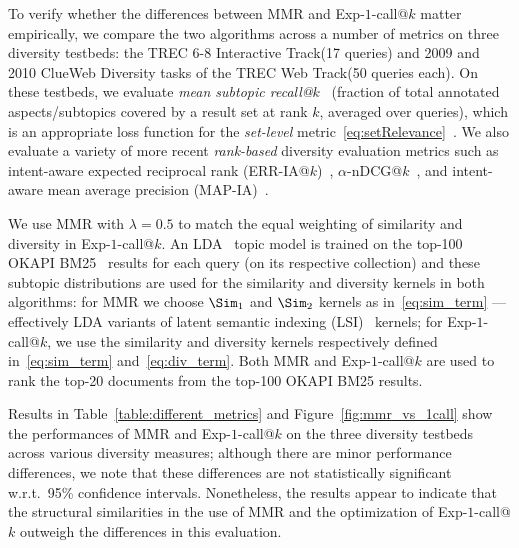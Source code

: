 
To verify whether the differences between MMR and Exp-$1$-call@$k$
matter empirically, we compare the two algorithms across a number of
metrics on three diversity testbeds: the TREC 6-8 Interactive
Track\footnotemark[1] (17 queries) and 2009 and 2010 ClueWeb Diversity
tasks of the TREC Web Track\footnotemark[2] (50 queries each).  On
these testbeds, we evaluate \emph{mean subtopic
recall@$k$}~\cite{zhai03Beyond} (fraction of total annotated
aspects/subtopics covered by a result set at rank $k$, averaged over
queries), which is an appropriate loss function for the
\emph{set-level} metric~\eqref{eq:setRelevance}~\cite{chen06Less}.  We
also evaluate a variety of more recent \emph{rank-based} diversity evaluation
metrics such as intent-aware expected reciprocal rank
(ERR-IA@$k$)~\cite{err-ia}, $\alpha$-nDCG@$k$~\cite{clarke08Novelty},
and intent-aware mean average precision
(MAP-IA)~\cite{agrawal09diversifying}.

We use MMR with $\lambda = 0.5$ to match the equal weighting of
similarity and diversity in Exp-$1$-call@$k$.  An
LDA~\cite{blei03Latent} topic model is trained on the top-100 OKAPI
BM25~\cite{bm25} results for each query (on its respective collection)
and these subtopic distributions are used for the similarity and
diversity kernels in both algorithms: for MMR we choose $\Sim_1$ and
$\Sim_2$ kernels as in~\eqref{eq:sim_term} --- effectively LDA
variants of latent semantic indexing (LSI)~\cite{deerwester90LSA}
kernels; for Exp-$1$-call@$k$, we use the similarity and diversity
kernels respectively defined in~\eqref{eq:sim_term}
and~\eqref{eq:div_term}.  Both MMR and Exp-$1$-call@$k$ are used to
rank the top-20 documents from the top-100 OKAPI BM25 results.

Results in Table~\ref{table:different_metrics} and
Figure~\ref{fig:mmr_vs_1call} show the performances of MMR and
Exp-$1$-call@$k$ on the three diversity testbeds across various
diversity measures; although there are minor performance differences,
we note that these differences are not statistically significant
w.r.t.\ 95\% confidence intervals.  Nonetheless, the results appear to
indicate that the structural similarities in the use of MMR and the
optimization of Exp-$1$-call@$k$ outweigh the differences in this
evaluation.

